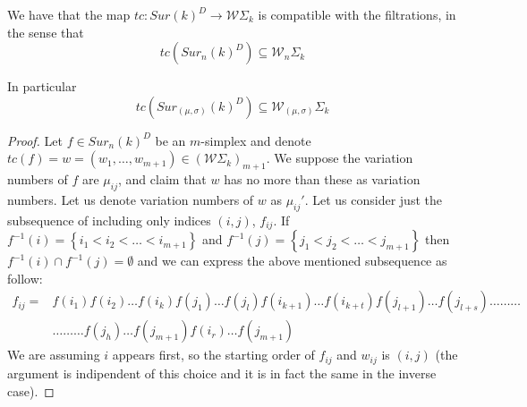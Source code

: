 \begin{lemma}[Compatibility of $tc$]
	We have that the map $tc:Sur(k)^{D}\rightarrow \mathcal{W}\Sigma_{k}$ is compatible with the filtrations, in the sense that 
	$$tc(Sur_{n}(k)^{D})\subseteq \mathcal{W}_{n}\Sigma_{k}$$
	
	In particular 
	$$tc(Sur_{(\mu,\sigma)}(k)^{D})\subseteq \mathcal{W}_{(\mu,\sigma)}\Sigma_{k}$$
\end{lemma}
\begin{proof}
Let  $f\in Sur_{n}(k)^{D}$ be an $m$-simplex and denote 
$tc(f)=w=(w_{1},\dots,w_{m+1})\in (\mathcal{W}\Sigma_{k})_{m+1}$. We suppose the variation numbers of $f$ are $\mu_{ij}$, and claim that $w$ has no more than these as variation numbers.  Let us denote variation numbers of $w$ as $\mu_{ij}'$. 
Let us consider just the subsequence of including only indices $(i,j)$, $f_{ij}$. If $f^{-1}(i)=\left\lbrace i_{1}<i_{2}<\dots<i_{m+1}\right\rbrace $ and $f^{-1}(j)=\left\lbrace j_{1}<j_{2}<\dots<j_{m+1}\right\rbrace $ then $f^{-1}(i)\cap f^{-1}(j)=\emptyset$ and we can express the above mentioned subsequence as follow:
\begin{equation*}
\begin{split}
f_{ij}=&f(i_{1})f(i_{2})\dots f(i_{k})f(j_{1})\dots f(j_{l})f(i_{k+1})\dots f(i_{k+t})f(j_{l+1})\dots f(j_{l+s})\dots \dots \dots  \\
&\dots \dots \dots  f(j_{h})\dots f(j_{m+1})f(i_{r})\dots f(j_{m+1})
\end{split}
\end{equation*}
We are assuming $i$ appears first, so the starting order of $f_{ij}$ and $w_{ij}$ is $(i,j)$ (the argument is indipendent of this choice and it is in fact the same in the inverse case).




\end{proof}
